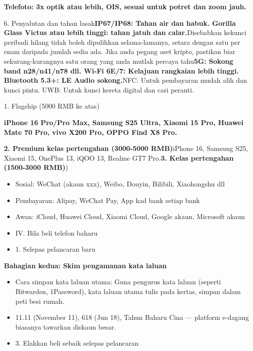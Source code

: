 \textbf{Telefoto: 3x optik atau lebih, OIS, sesuai untuk potret dan zoom jauh.}\par

6. Penyalutan dan tahan lasak\textbf{IP67/IP68: Tahan air dan habuk. Gorilla Glass Victus atau lebih tinggi: tahan jatuh dan calar.}Disebabkan kekunci peribadi hilang tidak boleh dipulihkan selama-lamanya, setara dengan satu per enam daripada jumlah sedia ada. Jika anda pegang aset kripto, pastikan biar sekurang-kurangnya satu orang yang anda mutlak percaya tahu\textbf{5G: Sokong band n28/n41/n78 dll. Wi-Fi 6E/7: Kelajuan rangkaian lebih tinggi. Bluetooth 5.3+: LE Audio sokong.}NFC: Untuk pembayaran mudah alih dan kunci pintu. UWB: Untuk kunci kereta digital dan cari peranti.


1. Flagship (5000 RMB ke atas)

\textbf{iPhone 16 Pro/Pro Max, Samsung S25 Ultra, Xiaomi 15 Pro, Huawei Mate 70 Pro, vivo X200 Pro, OPPO Find X8 Pro.}\par

\textbf{2. Premium kelas pertengahan (3000-5000 RMB)}iPhone 16, Samsung S25, Xiaomi 15, OnePlus 13, iQOO 13, Realme GT7 Pro.\textbf{3. Kelas pertengahan (1500-3000 RMB)})

\begin{itemize}
  \item Sosial: WeChat (akaun xxx), Weibo, Douyin, Bilibili, Xiaohongshu dll
  \item Pembayaran: Alipay, WeChat Pay, App kad bank setiap bank
  \item Awan: iCloud, Huawei Cloud, Xiaomi Cloud, Google akaun, Microsoft akaun
  \item IV. Bila beli telefon baharu
  \item 1. Selepas pelancaran baru
\end{itemize}

\textbf{Bahagian kedua: Skim pengamanan kata laluan}

\begin{itemize}
  \item Cara simpan kata laluan utama: Guna pengurus kata laluan (seperti Bitwarden, 1Password), kata laluan utama tulis pada kertas, simpan dalam peti besi rumah.
  \item 11.11 (November 11), 618 (Jun 18), Tahun Baharu Cina — platform e-dagang biasanya tawarkan diskaun besar.
  \item 3. Elakkan beli sebaik selepas pelancaran
\end{itemize}

